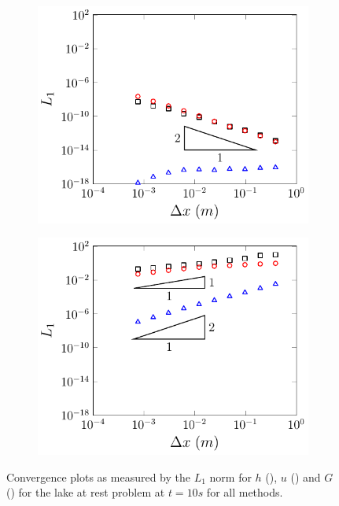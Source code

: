 \begin{figure}
\begin{subfigure}{0.5\textwidth}
	\end{subfigure}
	\begin{subfigure}{0.5\textwidth}
		\includegraphics[width=\textwidth]{./chp5/figures/Analytic/LakeAtRest/L1/FDVMWB.pdf}
		\vspace{0.3cm}
	\end{subfigure}%
	\begin{subfigure}{0.5\textwidth}
		\includegraphics[width=\textwidth]{./chp5/figures/Analytic/LakeAtRest/L1/FDVMnWB.pdf}
		\vspace{0.3cm}
	\end{subfigure}
	\caption{Convergence plots as measured by the $L_1$ norm for $h$ (), $u$ () and $G$ () for the lake at rest problem at $t=10s$ for all methods.}
	\label{fig:LakeAtRestEL1}
\end{figure}

